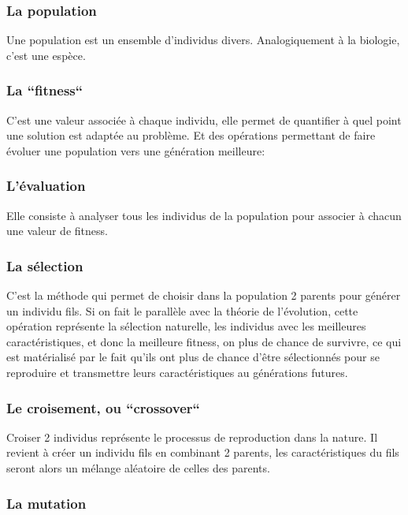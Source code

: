 \documentclass[12pt]{article}
\begin{document}
\subsubsection{La population}

Une population est un ensemble d'individus divers. Analogiquement à la biologie, c'est une espèce.    

\subsubsection{La ``fitness``}

C'est une valeur associée à chaque individu, elle permet de quantifier à quel point
une solution est adaptée au problème.
Et des opérations permettant de faire évoluer une population vers une génération meilleure:

\subsubsection{L'évaluation}

Elle consiste à analyser tous les individus de la population pour associer à chacun une valeur de fitness.

\subsubsection{La sélection}

C'est la méthode qui permet de choisir dans la population 2 parents pour générer un individu fils.
Si on fait le parallèle avec la théorie de l'évolution, cette opération représente la sélection naturelle,
les individus avec les meilleures caractéristiques, et donc la meilleure fitness, on plus de chance de survivre,
ce qui est matérialisé par le fait qu'ils ont plus de chance d'être sélectionnés pour se reproduire et transmettre
leurs caractéristiques au générations futures.

\subsubsection{Le croisement, ou ``crossover``}

Croiser 2 individus représente le processus de reproduction dans la nature. Il revient à créer un individu fils
en combinant 2 parents, les caractéristiques du fils seront alors un mélange aléatoire de celles des parents.

\subsubsection{La mutation}
\end{document}
